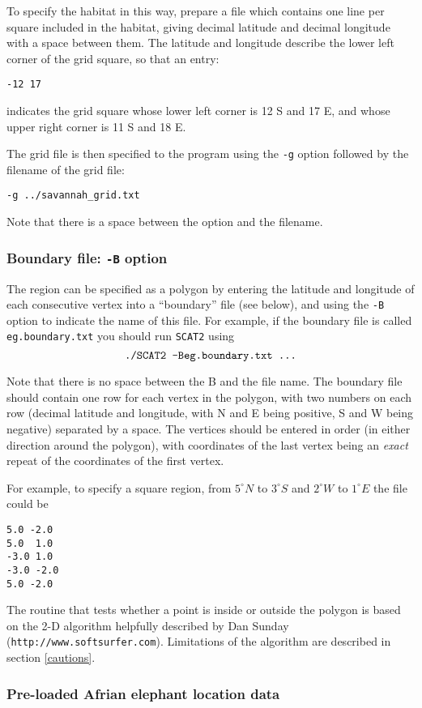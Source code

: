 \documentclass[10pt,titlepage,times,letterpaper]{article}
\def\SCAT{{\tt SCAT2} }
\begin{document}
To specify the habitat in this way, prepare a file which contains one line per
square included in the habitat, giving decimal latitude and decimal longitude with
a space between them.  The latitude and longitude describe the lower left corner of
the grid square, so that an entry:

{\tt -12 17}

indicates the grid square whose lower left corner is 12 S and 17 E, and whose upper right 
corner is 11 S and 18 E.

The grid file is then specified to the program using the {\tt -g} option followed
by the filename of the grid file:

{\tt -g ../savannah\_grid.txt}

Note that there is a space between the option and the filename.

\subsubsection{Boundary file:  {\tt -B} option}
The region can be specified as a polygon by entering the latitude and longitude of
each consecutive vertex into a ``boundary'' file (see below), and using
the {\tt -B} option to indicate the name of this file.
For example, if the boundary file is called {\tt eg.boundary.txt} you
should run \SCAT using
$$\text{\tt ./SCAT2 -Beg.boundary.txt ...}$$ 

Note that there is no space between the B and the file name.
The boundary file should contain one row for each vertex in the
polygon, with two numbers on each row (decimal latitude and longitude,
with N and E being positive, S and W being negative) separated by a
space. The vertices should be entered in order (in either direction
around the polygon), with coordinates of the last vertex being an {\it
exact} repeat of the coordinates of the first vertex.

For example, to specify a square region, from $5^\circ N$ to $3^\circ S$ and
$2^\circ W$ to $1^\circ E$ the file could be
\begin{verbatim}
5.0 -2.0
5.0  1.0
-3.0 1.0
-3.0 -2.0
5.0 -2.0
\end{verbatim}

The routine that tests whether a point is inside or outside the polygon
is based on the 2-D algorithm helpfully
described by Dan Sunday ({\tt http://www.softsurfer.com}). 
Limitations of the algorithm are described in section \ref{cautions}.

\subsubsection{Pre-loaded Afrian elephant location data}
\end{document}
